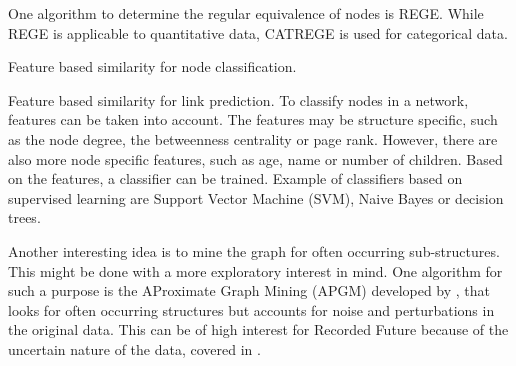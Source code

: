 One algorithm to determine the regular equivalence of nodes is REGE. While REGE is applicable to quantitative data, CATREGE is used for categorical data. 

Feature based similarity for node classification. 

Feature based similarity for link prediction. To classify nodes in a network, features can be taken into account. The features may be structure specific, such as the node degree, the betweenness centrality or page rank. However, there are also more node specific features, such as age, name or number of children. Based on the features, a classifier can be trained. Example of classifiers based on supervised learning are Support Vector Machine (SVM), Naive Bayes or decision trees.

Another interesting idea is to mine the graph for often occurring sub-structures. This might be done with a more exploratory interest in mind. One algorithm for such a purpose is the AProximate Graph Mining (APGM) developed by \citet{Jia2011}, that looks for often occurring structures but accounts for noise and perturbations in the original data. This can be of high interest for Recorded Future because of the uncertain nature of the data, covered in .